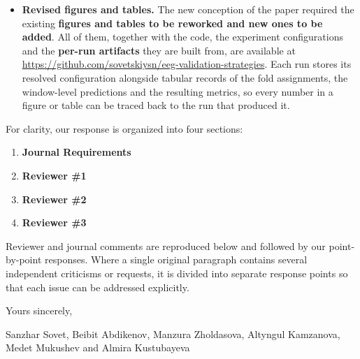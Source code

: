 \documentclass{article}
\begin{document}
\begin{itemize}
{	      dataset}. Grouping this way ensures that overlapping windows from one
	      acquisition never span folds. The \textbf{cross-session scenario was
	      removed} and no cross-trial variant was introduced in its place.
	      \textbf{Cross-task evaluation was made subject-disjoint}, training on
	      the source composition of all but one participant and testing on the
	      target composition of the held-out participant. The
	      \textbf{cross-dataset protocol drew no objection and is unchanged}.
	\item \textbf{Revised figures and tables.} The new conception of the paper
	      required the existing \textbf{figures and tables to be reworked and
	      new ones to be added}. All of them, together with the code, the
	      experiment configurations and the \textbf{per-run artifacts} they are
	      built from, are available at
	      \url{https://github.com/sovetskiysn/eeg-validation-strategies}. Each
	      run stores its resolved configuration alongside tabular records of the
	      fold assignments, the window-level predictions and the resulting
	      metrics, so every number in a figure or table can be traced back to
	      the run that produced it.
\end{itemize}

\noindent
For clarity, our response is organized into four sections:

\begin{enumerate}
	\item \textbf{Journal Requirements}
	\item \textbf{Reviewer \#1}
	\item \textbf{Reviewer \#2}
	\item \textbf{Reviewer \#3}
\end{enumerate}

\noindent
Reviewer and journal comments are reproduced below and followed by our
point-by-point responses. Where a single original paragraph contains several
independent criticisms or requests, it is divided into separate response points
so that each issue can be addressed explicitly.

\vspace{0.4cm}
\noindent
Yours sincerely,

\vspace{0.2cm}
\noindent
Sanzhar Sovet, Beibit Abdikenov, Manzura Zholdasova, Altyngul Kamzanova,
Medet Mukushev and Almira Kustubayeva


\newpage
\setcounter{tcb@cnt@cmt}{0}
\end{document}
